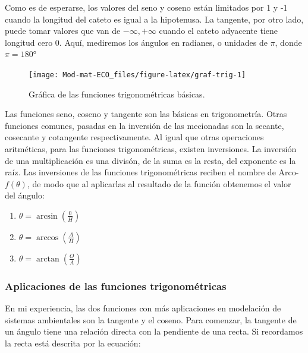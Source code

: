 \documentclass[
]{book}
\providecommand{\tightlist}{%
  \setlength{\itemsep}{0pt}\setlength{\parskip}{0pt}}
\begin{document}
Como es de esperarse, los valores del seno y coseno están limitados por 1 y -1 cuando la longitud del cateto es igual a la hipotenusa. La tangente, por otro lado, puede tomar valores que van de \(-\infty, +\infty\) cuando el cateto adyacente tiene longitud cero \(0\). Aquí, mediremos los ángulos en radianes, o unidades de \(\pi\), donde \(\pi = 180°\)

\begin{figure}

{\centering \texttt{[image: Mod-mat-ECO\_files/figure-latex/graf-trig-1]} 

}

\caption{Gráfica de las funciones trigonométricas básicas.}\label{fig:graf-trig}
\end{figure}

Las funciones seno, coseno y tangente son las básicas en trigonometría. Otras funciones comunes, pasadas en la inversión de las mecionadas son la secante, cosecante y cotangente respectivamente. Al igual que otras operaciones aritméticas, para las funciones trigonométricas, existen inversiones. La inversión de una multiplicación es una divisón, de la suma es la resta, del exponente es la raíz. Las inversiones de las funciones trigonométricas reciben el nombre de Arco-\(f(\theta)\), de modo que al aplicarlas al resultado de la función obtenemos el valor del ángulo:

\begin{enumerate}
\def\labelenumi{\arabic{enumi}.}
\tightlist
\item
  \(\theta = \arcsin \left(\frac{0}{H}\right)\)
\item
  \(\theta = \arccos \left(\frac{A}{H}\right)\)
\item
  \(\theta = \arctan \left(\frac{O}{A} \right)\)
\end{enumerate}

\hypertarget{aplicaciones-de-las-funciones-trigonomuxe9tricas}{%
\subsubsection{Aplicaciones de las funciones trigonométricas}\label{aplicaciones-de-las-funciones-trigonomuxe9tricas}}

En mi experiencia, las dos funciones con más aplicaciones en modelación de sistemas ambientales son la tangente y el coseno. Para comenzar, la tangente de un ángulo tiene una relación directa con la pendiente de una recta. Si recordamos la recta está descrita por la ecuación:
\end{document}
